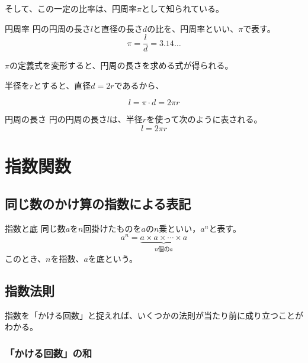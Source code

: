 \documentclass[../math-imaging]{subfiles}
\begin{document}
そして、この一定の比率は、円周率$\pi$として知られている。

\begin{definition}{円周率}
  円の円周の長さ$l$と直径の長さ$d$の比を、円周率といい、$\pi$で表す。
  \LARGE
  \begin{equation}
    \pi = \dfrac{l}{d} = 3.14\ldots
  \end{equation}
\end{definition}

$\pi$の定義式を変形すると、円周の長さを求める式が得られる。

半径を$r$とすると、直径$d = 2r$であるから、

\begin{equation}
  l = \pi \cdot d = 2\pi r
\end{equation}

\begin{theorem}{円周の長さ}
  円の円周の長さ$l$は、半径$r$を使って次のように表される。
  \LARGE
  \begin{equation}
    l = 2\pi r
  \end{equation}
\end{theorem}

\section{指数関数}

\subsection{同じ数のかけ算の指数による表記}

\begin{definition}{指数と底}
  \newline
  同じ数$a$を$n$回掛けたものを$a$の$n$乗といい，$a^n$と表す。
  \LARGE
  \begin{equation}
    a^n = \underbrace{a \times a \times \cdots \times a}_{n\text{個の}a}
  \end{equation}
  \normalsize
  このとき、$n$を指数、$a$を底という。
\end{definition}

\subsection{指数法則}

指数を「かける回数」と捉えれば、いくつかの法則が当たり前に成り立つことがわかる。

\subsubsection{「かける回数」の和}
\end{document}
